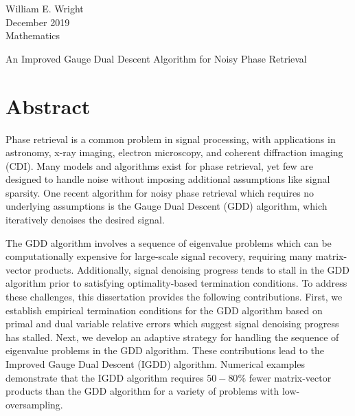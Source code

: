 {\singlespacing
   \begin{flushright}
      William E. Wright \\
      December 2019 \\
      Mathematics \\
   \end{flushright}
}

\bigskip

\begin{center}
   An Improved Gauge Dual Descent Algorithm for Noisy Phase Retrieval \\
\end{center}

\section*{Abstract}

Phase retrieval is a common problem in signal processing, with applications in astronomy, x-ray imaging, electron microscopy, and coherent diffraction imaging (CDI).
Many models and algorithms exist for phase retrieval,
yet few are designed to handle noise without imposing additional assumptions like signal sparsity.  
One recent algorithm for noisy phase retrieval which requires no underlying assumptions is the Gauge Dual Descent (GDD) algorithm, which iteratively denoises the desired signal.

The GDD algorithm involves a sequence of eigenvalue problems which can be computationally expensive for large-scale signal recovery, requiring many matrix-vector products.
Additionally, signal denoising progress tends to stall in the GDD algorithm prior to satisfying optimality-based termination conditions.
To address these challenges, this dissertation provides the following contributions.
First, we establish empirical termination conditions for the GDD algorithm based on primal and dual variable relative errors which suggest signal denoising progress has stalled.
Next, we develop an adaptive strategy for handling the sequence of eigenvalue problems in the GDD algorithm.
These contributions lead to the Improved Gauge Dual Descent (IGDD) algorithm.
Numerical examples demonstrate that the IGDD algorithm requires $50-80\%$ fewer matrix-vector products than the GDD algorithm for a variety of problems with low-oversampling.
